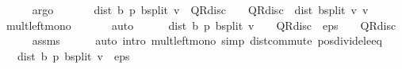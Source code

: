 \begin{isabellebody}
\ \ \ \ \isamarkupfalse%
\ argo\isanewline
\ \ \isamarkupfalse%
\ \ {\isachardoublequoteopen}{}\ {\isacharasterisk}{\kern0pt}\ dist\ {\isacharparenleft}{\kern0pt}{\isasymnu}\isactrlsub b\ {\isacharquery}{\kern0pt}p{\isacharparenright}{\kern0pt}\ {\isacharparenleft}{\kern0pt}{\isasymL}\isactrlsub b{\isacharunderscore}{\kern0pt}split\ v{\isacharparenright}{\kern0pt}\ {\isacharasterisk}{\kern0pt}\ {\isacharparenleft}{\kern0pt}{}{\isacharminus}{\kern0pt}QR{\isacharunderscore}{\kern0pt}disc{\isacharparenright}{\kern0pt}\ {\isasymle}\ {}\ {\isacharasterisk}{\kern0pt}\ {\isacharparenleft}{\kern0pt}QR{\isacharunderscore}{\kern0pt}disc\ {\isacharasterisk}{\kern0pt}\ dist\ {\isacharparenleft}{\kern0pt}{\isasymL}\isactrlsub b{\isacharunderscore}{\kern0pt}split\ v{\isacharparenright}{\kern0pt}\ v{\isacharparenright}{\kern0pt}{\isachardoublequoteclose}\isanewline
\ \ \ \ \isamarkupfalse%
\ mult{\isacharunderscore}{\kern0pt}left{\isacharunderscore}{\kern0pt}mono\ \isanewline
\ \ \ \ \isamarkupfalse%
\ auto\isanewline
\ \ \isamarkupfalse%
\ {\isachardoublequoteopen}{}\ {\isacharasterisk}{\kern0pt}\ dist\ {\isacharparenleft}{\kern0pt}{\isasymnu}\isactrlsub b\ {\isacharquery}{\kern0pt}p{\isacharparenright}{\kern0pt}\ {\isacharparenleft}{\kern0pt}{\isasymL}\isactrlsub b{\isacharunderscore}{\kern0pt}split\ v{\isacharparenright}{\kern0pt}\ {\isacharasterisk}{\kern0pt}\ {\isacharparenleft}{\kern0pt}{}\ {\isacharminus}{\kern0pt}\ QR{\isacharunderscore}{\kern0pt}disc{\isacharparenright}{\kern0pt}\ {\isasymle}\ eps\ {\isacharasterisk}{\kern0pt}\ {\isacharparenleft}{\kern0pt}{}\ {\isacharminus}{\kern0pt}\ QR{\isacharunderscore}{\kern0pt}disc{\isacharparenright}{\kern0pt}{\isachardoublequoteclose}\isanewline
\ \ \ \ \isamarkupfalse%
\ assms\isanewline
\ \ \ \ \isamarkupfalse%
\ {\isacharparenleft}{\kern0pt}auto\ intro{\isacharbang}{\kern0pt}{\isacharcolon}{\kern0pt}\ mult{\isacharunderscore}{\kern0pt}left{\isacharunderscore}{\kern0pt}mono\ simp{\isacharcolon}{\kern0pt}\ dist{\isacharunderscore}{\kern0pt}commute\ pos{\isacharunderscore}{\kern0pt}divide{\isacharunderscore}{\kern0pt}le{\isacharunderscore}{\kern0pt}eq{\isacharparenright}{\kern0pt}\isanewline
\ \ \isamarkupfalse%
\ {\isachardoublequoteopen}{}\ {\isacharasterisk}{\kern0pt}\ dist\ {\isacharparenleft}{\kern0pt}{\isasymnu}\isactrlsub b\ {\isacharquery}{\kern0pt}p{\isacharparenright}{\kern0pt}\ {\isacharparenleft}{\kern0pt}{\isasymL}\isactrlsub b{\isacharunderscore}{\kern0pt}split\ v{\isacharparenright}{\kern0pt}\ {\isasymle}\ eps{\isachardoublequoteclose}\isanewline

\end{isabellebody}
